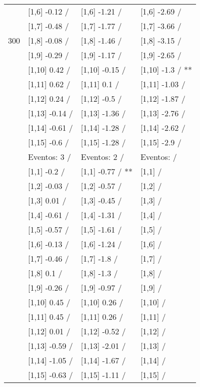 \begin{table}
\begin{tabular}[t]{llll}
 & {}[1,6] -0.12  / & {}[1,6] -1.21  / & {}[1,6] -2.69  /\\
 & {}[1,7] -0.48  / & {}[1,7] -1.77  / & {}[1,7] -3.66  /\\
300 & {}[1,8] -0.08  / & {}[1,8] -1.46  / & {}[1,8] -3.15  /\\
\addlinespace
 & {}[1,9] -0.29  / & {}[1,9] -1.17  / & {}[1,9] -2.65  /\\
 & {}[1,10] 0.42  / & {}[1,10] -0.15  / & {}[1,10] -1.3  / **\\
 & {}[1,11] 0.62  / & {}[1,11] 0.1  / & {}[1,11] -1.03  /\\
 & {}[1,12] 0.24  / & {}[1,12] -0.5  / & {}[1,12] -1.87  /\\
 & {}[1,13] -0.14  / & {}[1,13] -1.36  / & {}[1,13] -2.76  /\\
\addlinespace
 & {}[1,14] -0.61  / & {}[1,14] -1.28  / & {}[1,14] -2.62  /\\
 & {}[1,15] -0.6  / & {}[1,15] -1.28  / & {}[1,15] -2.9  /\\
 & Eventos:  3 / & Eventos:  2 / & Eventos:   /\\
 & {}[1,1] -0.2  / & {}[1,1] -0.77  / ** & {}[1,1]  /\\
 & {}[1,2] -0.03  / & {}[1,2] -0.57  / & {}[1,2]  /\\
\addlinespace
 & {}[1,3] 0.01  / & {}[1,3] -0.45  / & {}[1,3]  /\\
 & {}[1,4] -0.61  / & {}[1,4] -1.31  / & {}[1,4]  /\\
 & {}[1,5] -0.57  / & {}[1,5] -1.61  / & {}[1,5]  /\\
 & {}[1,6] -0.13  / & {}[1,6] -1.24  / & {}[1,6]  /\\
 & {}[1,7] -0.46  / & {}[1,7] -1.8  / & {}[1,7]  /\\
\addlinespace
500 & {}[1,8] 0.1  / & {}[1,8] -1.3  / & {}[1,8]  /\\
 & {}[1,9] -0.26  / & {}[1,9] -0.97  / & {}[1,9]  /\\
 & {}[1,10] 0.45  / & {}[1,10] 0.26  / & {}[1,10]  /\\
 & {}[1,11] 0.45  / & {}[1,11] 0.26  / & {}[1,11]  /\\
 & {}[1,12] 0.01  / & {}[1,12] -0.52  / & {}[1,12]  /\\
\addlinespace
 & {}[1,13] -0.59  / & {}[1,13] -2.01  / & {}[1,13]  /\\
 & {}[1,14] -1.05  / & {}[1,14] -1.67  / & {}[1,14]  /\\
 & {}[1,15] -0.63  / & {}[1,15] -1.11  / & {}[1,15]  /\\
\bottomrule
\end{tabular}
\end{table}
